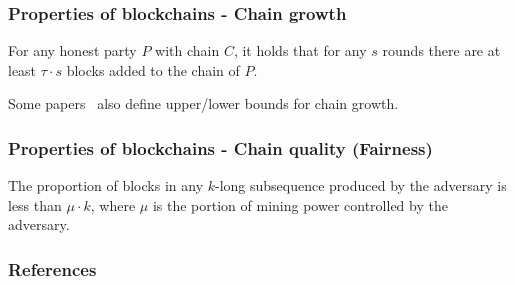 \documentclass{beamer}
\begin{document}
\begin{frame}
\frametitle{Properties of blockchains - Chain growth}

\begin{definition}
For any honest party $P$ with chain $C$, it holds that for any $s$ rounds there are at least $\tau \cdot s$ blocks added to the chain of $P$.
\end{definition}

Some papers~\cite{rocket2018snowflake}\cite{pass2017sleepy} also define upper/lower bounds for chain growth.


\end{frame}


\begin{frame}
\frametitle{Properties of blockchains - Chain quality (Fairness)}
    
\begin{definition}
The proportion of blocks in any $k$-long subsequence produced by the adversary is less than $\mu \cdot k$, where $\mu$ is the portion of mining power controlled by the adversary.
\end{definition}

\end{frame}


\begin{frame}[allowframebreaks]
    \frametitle{References}
    
    \tiny
\end{frame}
\end{document}
